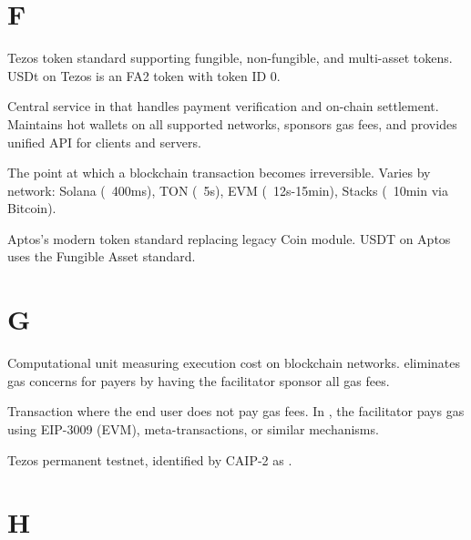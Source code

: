 \section*{F}

\begin{description}[style=nextline]

\item[FA2 (TZIP-12)]
Tezos token standard supporting fungible, non-fungible, and multi-asset tokens. USDt on Tezos is an FA2 token with token ID 0.

\item[Facilitator]
Central service in \tprotocol{} that handles payment verification and on-chain settlement. Maintains hot wallets on all supported networks, sponsors gas fees, and provides unified API for clients and servers.

\item[Finality]
The point at which a blockchain transaction becomes irreversible. Varies by network: Solana (~400ms), TON (~5s), EVM (~12s-15min), Stacks (~10min via Bitcoin).

\item[Fungible Asset]
Aptos's modern token standard replacing legacy Coin module. USDT on Aptos uses the Fungible Asset standard.

\end{description}

\section*{G}

\begin{description}[style=nextline]

\item[Gas]
Computational unit measuring execution cost on blockchain networks. \tprotocol{} eliminates gas concerns for payers by having the facilitator sponsor all gas fees.

\item[Gasless Transaction]
Transaction where the end user does not pay gas fees. In \tprotocol{}, the facilitator pays gas using EIP-3009 (EVM), meta-transactions, or similar mechanisms.

\item[Ghostnet]
Tezos permanent testnet, identified by CAIP-2 as .

\end{description}

\section*{H}

